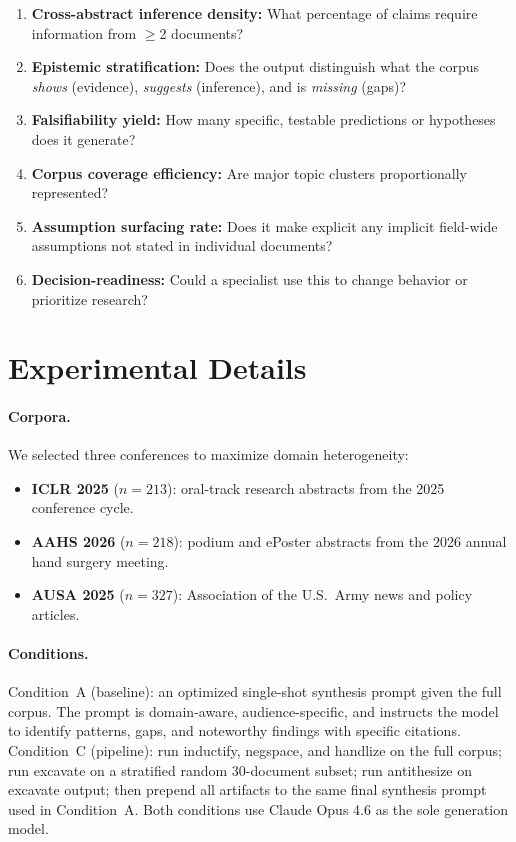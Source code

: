 \documentclass{article}
\begin{document}
\begin{enumerate}
    \item \textbf{Cross-abstract inference density:} What percentage of claims require information from $\geq$2 documents?
    \item \textbf{Epistemic stratification:} Does the output distinguish what the corpus \textit{shows} (evidence), \textit{suggests} (inference), and is \textit{missing} (gaps)?
    \item \textbf{Falsifiability yield:} How many specific, testable predictions or hypotheses does it generate?
    \item \textbf{Corpus coverage efficiency:} Are major topic clusters proportionally represented?
    \item \textbf{Assumption surfacing rate:} Does it make explicit any implicit field-wide assumptions not stated in individual documents?
    \item \textbf{Decision-readiness:} Could a specialist use this to change behavior or prioritize research?
\end{enumerate}

\section{Experimental Details}
\label{app:experimental}

\paragraph{Corpora.} We selected three conferences to maximize domain heterogeneity:
\begin{itemize}
    \item \textbf{ICLR 2025} ($n{=}213$): oral-track research abstracts from the 2025 conference cycle.
    \item \textbf{AAHS 2026} ($n{=}218$): podium and ePoster abstracts from the 2026 annual hand surgery meeting.
    \item \textbf{AUSA 2025} ($n{=}327$): Association of the U.S.\ Army news and policy articles.
\end{itemize}

\paragraph{Conditions.} Condition~A (baseline): an optimized single-shot synthesis prompt given the full corpus. The prompt is domain-aware, audience-specific, and instructs the model to identify patterns, gaps, and noteworthy findings with specific citations. Condition~C (pipeline): run inductify, negspace, and handlize on the full corpus; run excavate on a stratified random 30-document subset; run antithesize on excavate output; then prepend all artifacts to the same final synthesis prompt used in Condition~A. Both conditions use Claude Opus 4.6 as the sole generation model.
\end{document}
